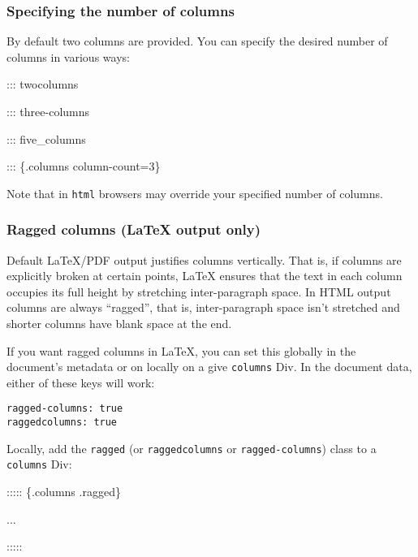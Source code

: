 \documentclass[
]{article}
\newenvironment{Shaded}{}{}
\newcommand{\NormalTok}[1]{#1}
\begin{document}
\hypertarget{specifying-the-number-of-columns}{%
\subsubsection{Specifying the number of
columns}\label{specifying-the-number-of-columns}}

By default two columns are provided. You can specify the desired number
of columns in various ways:

\begin{Shaded}
\begin{Highlighting}[]
\NormalTok{::: twocolumns}

\NormalTok{::: three{-}columns}

\NormalTok{::: five\_columns}

\NormalTok{::: \{.columns column{-}count=3\}}
\end{Highlighting}
\end{Shaded}

Note that in \texttt{html} browsers may override your specified number
of columns.

\hypertarget{ragged-columns-latex-output-only}{%
\subsubsection{Ragged columns (LaTeX output
only)}\label{ragged-columns-latex-output-only}}

Default LaTeX/PDF output justifies columns vertically. That is, if
columns are explicitly broken at certain points, LaTeX ensures that the
text in each column occupies its full height by stretching
inter-paragraph space. In HTML output columns are always ``ragged'',
that is, inter-paragraph space isn't stretched and shorter columns have
blank space at the end.

If you want ragged columns in LaTeX, you can set this globally in the
document's metadata or on locally on a give \texttt{columns} Div. In the
document data, either of these keys will work:

\begin{verbatim}
ragged-columns: true
raggedcolumns: true
\end{verbatim}

Locally, add the \texttt{ragged} (or \texttt{raggedcolumns} or
\texttt{ragged-columns}) class to a \texttt{columns} Div:

\begin{Shaded}
\begin{Highlighting}[]
\NormalTok{::::: \{.columns .ragged\}}

\NormalTok{...}

\NormalTok{:::::}
\end{Highlighting}
\end{Shaded}
\end{document}

